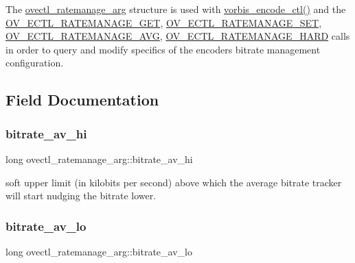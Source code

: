 The \hyperlink{structovectl__ratemanage__arg}{ovectl\+\_\+ratemanage\+\_\+arg} structure is used with \hyperlink{vorbisenc_8h_a5f398a378e20b8ce5e3341a582e773bd}{vorbis\+\_\+encode\+\_\+ctl()} and the \hyperlink{vorbisenc_8h_a614481c0d84bdfbb80eed9208b68f779}{O\+V\+\_\+\+E\+C\+T\+L\+\_\+\+R\+A\+T\+E\+M\+A\+N\+A\+G\+E\+\_\+\+G\+ET}, \hyperlink{vorbisenc_8h_a1daa1fd8ce1064cce01dde3ad447d389}{O\+V\+\_\+\+E\+C\+T\+L\+\_\+\+R\+A\+T\+E\+M\+A\+N\+A\+G\+E\+\_\+\+S\+ET}, \hyperlink{vorbisenc_8h_a34c3170d227b6368041e59c1dc7ed6e4}{O\+V\+\_\+\+E\+C\+T\+L\+\_\+\+R\+A\+T\+E\+M\+A\+N\+A\+G\+E\+\_\+\+A\+VG}, \hyperlink{vorbisenc_8h_af8869980a805f431af57a50dffbf5d33}{O\+V\+\_\+\+E\+C\+T\+L\+\_\+\+R\+A\+T\+E\+M\+A\+N\+A\+G\+E\+\_\+\+H\+A\+RD} calls in order to query and modify specifics of the encoder\textquotesingle{}s bitrate management configuration. 

\subsection{Field Documentation}
\mbox{\label{structovectl__ratemanage__arg_ac1e81b5a2e705022ca895f494718ded7}} 
\subsubsection{\texorpdfstring{bitrate\+\_\+av\+\_\+hi}{bitrate\_av\_hi}}
{\footnotesize\ttfamily long ovectl\+\_\+ratemanage\+\_\+arg\+::bitrate\+\_\+av\+\_\+hi}

soft upper limit (in kilobits per second) above which the average bitrate tracker will start nudging the bitrate lower. \mbox{\label{structovectl__ratemanage__arg_ac241670a3a608f114acaf8f26fe4e913}} 
\subsubsection{\texorpdfstring{bitrate\+\_\+av\+\_\+lo}{bitrate\_av\_lo}}
{\footnotesize\ttfamily long ovectl\+\_\+ratemanage\+\_\+arg\+::bitrate\+\_\+av\+\_\+lo}

